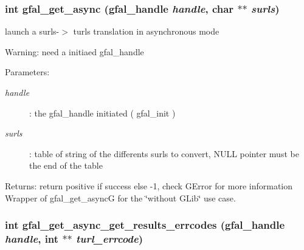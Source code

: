 \subsubsection{\setlength{\rightskip}{0pt plus 5cm}int gfal\_\-get\_\-async (gfal\_\-handle {\em handle}, char $\ast$$\ast$ {\em surls})}\label{gfal__common__interface_8c_68ef05f37b4971c8306b1cc6ee529647}


launch a surls-$>$ turls translation in asynchronous mode 

\begin{Desc}
\item[Warning:]need a initiaed gfal\_\-handle \end{Desc}
\begin{Desc}
\item[Parameters:]
\begin{description}
\item[{\em handle}]: the gfal\_\-handle initiated ( gfal\_\-init ) \item[{\em surls}]: table of string of the differents surls to convert, NULL pointer must be the end of the table \end{description}
\end{Desc}
\begin{Desc}
\item[Returns:]return positive if success else -1, check GError for more information Wrapper of gfal\_\-get\_\-async\-G for the \char`\"{}without GLib\char`\"{} use case. \end{Desc}
\subsubsection{\setlength{\rightskip}{0pt plus 5cm}int gfal\_\-get\_\-async\_\-get\_\-results\_\-errcodes (gfal\_\-handle {\em handle}, int $\ast$$\ast$ {\em turl\_\-errcode})}\label{gfal__common__interface_8c_a3161f12f9d5c8151f44df4f132602cb}


